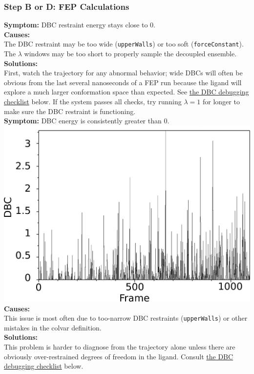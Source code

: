 \documentclass[9pt,tutorial]{Styling/livecoms}
\newcommand{\textInput}[1]{\texttt{#1}}
\begin{document}
\subsubsection{Step B or D: FEP Calculations}\label{sec:debugFEP}
\noindent\textbf{Symptom:}  DBC restraint energy stays close to 0.\\
\textbf{Causes:}\\
The DBC restraint may be too wide (\textInput{upperWalls}) or too soft (\textInput{forceConstant}). The $\lambda$ windows may be too short to properly sample the decoupled ensemble.\\
\textbf{Solutions:}\\
First, watch the trajectory for any abnormal behavior; wide DBCs will often be obvious from the last several nanoseconds of a FEP run because the ligand will explore a much larger conformation space than expected. See \hyperref[list:DBCdebug]{the DBC debugging checklist} below. If the system passes all checks, try running $\lambda=1$ for longer to make sure the DBC restraint is functioning.\\

\noindent\textbf{Symptom:} DBC energy is consistently greater than 0.\\
\includegraphics[width=0.9\linewidth]{tightDBC_alchsite.png}
\textbf{Causes:}\\
This issue is most often due to too-narrow DBC restraints (\textInput{upperWalls}) or other mistakes in the colvar definition.\\
\textbf{Solutions:}\\
This problem is harder to diagnose from the trajectory alone unless there are obviously over-restrained degrees of freedom in the ligand. Consult \hyperref[list:DBCdebug]{the DBC debugging checklist} below.\\
\end{document}
